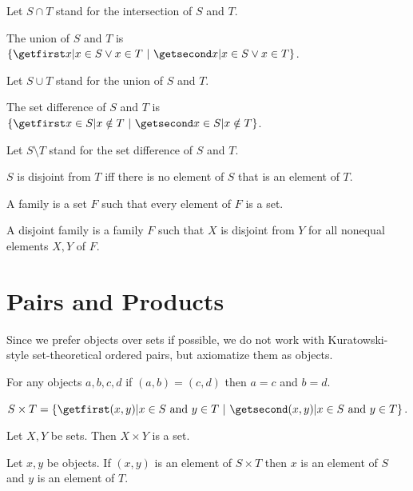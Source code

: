 \documentclass{article}
\begin{document}
\begin{forthel}
  Let $S \cap T$ stand for the intersection of $S$ and $T$.

  \begin{definition}
    The union of $S$ and $T$ is $\class{x | x \in S \vee x \in T}$.
  \end{definition}

  Let $S \cup T$ stand for the union of $S$ and $T$.

  \begin{definition}
    The set difference of $S$ and $T$ is $\class{x \in S | x \notin T}$.
  \end{definition}

  Let $S \setminus T$ stand for the set difference of $S$ and $T$.

  \begin{definition}
    $S$ is disjoint from $T$ iff there is no element of $S$ that is an element
    of $T$.
  \end{definition}

  \begin{definition}
    A family is a set $F$ such that every element of $F$ is a set.
  \end{definition}

  \begin{definition}
    A disjoint family is a family $F$ such that $X$ is disjoint from $Y$ for all
    nonequal elements $X, Y$ of $F$.
  \end{definition}
\end{forthel}


\section{Pairs and Products}

Since we prefer objects over sets if possible, we do not work
with Kuratowski-style set-theoretical ordered pairs, but
axiomatize them as objects.

\begin{forthel}
  \begin{axiom}
    For any objects $a, b, c, d$ if $(a,b) = (c,d)$ then $a = c$ and $b = d$.
  \end{axiom}

  \begin{definition}
    $S \times T = \class{(x,y) | \text{$x \in S$ and $y \in T$}}$.
  \end{definition}

  \begin{axiom}
    Let $X, Y$ be sets.
    Then $X \times Y$ is a set.
  \end{axiom}

  \begin{lemma}
    Let $x, y$ be objects.
    If $(x,y)$ is an element of $S \times T$ then $x$ is an element of $S$ and
    $y$ is an element of $T$.
  \end{lemma}
\end{forthel}
\end{document}
